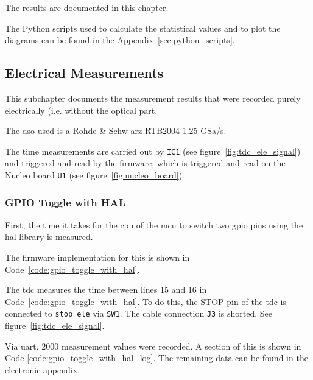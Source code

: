 The results are documented in this chapter.

The Python scripts used to calculate the statistical values and to plot the diagrams can be found in the
Appendix~\ref{sec:python_scripts}.

\subsection{Electrical Measurements}\label{sec:electrical_measurements}

This subchapter documents the measurement results that were recorded purely electrically (i.e. without the optical part.

The \acrfull{dso} used is a Rohde \& Schw arz RTB2004 1.25 GSa/s.

The time measurements are carried out by \lstinline|IC1| (see figure~\ref{fig:tdc_ele_signal}) and triggered and read by the
firmware, which is triggered and read on the Nucleo board \lstinline|U1| (see figure~\ref{fig:nucleo_board}).

\subsubsection{GPIO Toggle with HAL}\label{sec:gpio_toggle_with_hal}

First, the time it takes for the \acrshort{cpu} of the \acrshort{mcu} to switch two \acrshort{gpio} pins using the \acrfull{hal} library
\cite{st2020stm32f0_hal} is measured.

The firmware implementation for this is shown in Code~\ref{code:gpio_toggle_with_hal}.



The \acrshort{tdc} measures the time between lines 15 and 16 in Code~\ref{code:gpio_toggle_with_hal}. To do this, the
STOP pin of the \acrshort{tdc} is connected to \lstinline|stop_ele| via \lstinline|SW1|. The cable connection \lstinline|J3|
is shorted. See figure~\ref{fig:tdc_ele_signal}.

Via \acrshort{uart}, 2000 measurement values were recorded. A section of this is shown in Code \ref{code:gpio_toggle_with_hal_log}.
The remaining data can be found in the electronic appendix.




